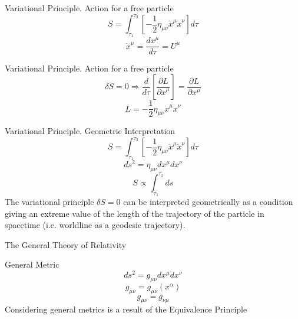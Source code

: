 \documentclass{beamer}
\begin{document}
\begin{darkframes}
        \begin{frame}{Variational Principle. Action for a free particle}
        	$$ S = \int_{\tau_1} ^{\tau_2} \left[ -\frac{1}{2} \eta_{\mu\nu} \dot{x}^\mu \dot{x}^\nu  \right] d\tau $$
            \pause
    		$$ \dot{x}^\mu = \frac{dx^\mu}{d\tau} = U^\mu  $$          
    	\end{frame}
        
        \begin{frame}{Variational Principle. Action for a free particle}
        	$$ \delta S = 0  \Longrightarrow  \frac{d}{d\tau} \left[ \frac{\partial L}{\partial \dot{x}^\mu} \right] = \frac{\partial L}{\partial x^\mu}$$
            \pause
    		$$ L = -\frac{1}{2} \eta_{\mu\nu} \dot{x}^\mu \dot{x}^\nu  $$ 
    	\end{frame}
        
        \begin{frame}{Variational Principle. Geometric Interpretation}
        	$$ S = \int_{\tau_1} ^{\tau_2} \left[ -\frac{1}{2} \eta_{\mu\nu} \dot{x}^\mu \dot{x}^\nu  \right] d\tau $$
            \pause 
            $$ ds^2 = \eta_{\mu\nu} dx^\mu dx^\nu $$
            \pause            
            $$ S \propto \int_{\tau_1} ^{\tau_2} ds $$            
            \pause
            \medskip
            \justify
    		{The variational principle $\delta S = 0$ can be interpreted geometrically as a condition giving an extreme value of the length of the trajectory of the particle in spacetime (i.e. worldline as a geodesic trajectory).}
    	\end{frame}
        
        \begin{frame}
        	\LARGE
            {The General Theory of Relativity}
    	\end{frame}
        
    	\begin{frame}{General Metric}
    		$$ ds^{2} = g_{\mu \nu} dx^{\mu} dx^{\nu} $$
            \pause
            $$ g_{\mu \nu} = g_{\mu \nu} \left( x^{\alpha} \right) $$
            \pause
            $$ g_{\mu \nu} = g_{\nu \mu} $$
           	\pause
            \bigskip
            \centering
            {Considering general metrics is a result of the Equivalence Principle}           
    	\end{frame}
    

\end{darkframes}
\end{document}
